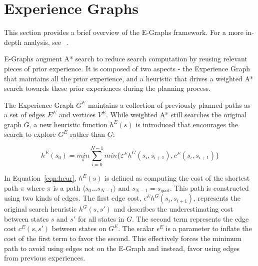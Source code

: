 \documentclass[letterpaper, 10 pt, conference]{ieeeconf}  %
\newcommand{\eqnref}[1]{Equation~\ref{eqn:#1}}
\newcommand{\eqnlab}[1]{\label{eqn:#1}}
\newcommand{\heg}{h^{E}}
\newcommand{\eeg}{\varepsilon^{E}}
\begin{document}
\section{Experience Graphs}

This section provides a brief overview of the E-Graphs framework. For a more
in-depth analysis, see ~\cite{PhillipsRSS:2012}.

E-Graphs augment A* search to reduce search computation by reusing relevant
pieces of prior experience. It is composed of two aspects - the Experience Graph
that maintains all the prior experience, and a heuristic that drives a weighted
A* search towards these prior experiences during the planning process.

The Experience Graph $G^E$ maintains a collection of previously planned paths as
a set of edges $E^E$ and vertices $V^E$. While weighted A* still
searches the original graph $G$, a new heuristic function $h^E(s)$ is introduced
that encourages the search to explore $G^E$ rather than $G$:

\begin{equation}
\heg(s_0) = \underset{\pi}{min} \sum\limits_{i=0}^{N-1} min \lbrace \eeg h^G(s_i,s_{i+1}), c^{E}(s_i,s_{i+1}) \rbrace 
\eqnlab{heur}
\end{equation}

In \eqnref{heur}, $h^E(s)$ is defined as computing the cost of the shortest path $\pi$
where $\pi$ is a path $\langle s_0 \dotsc s_{N-1} \rangle$ and
$s_{N-1}=s_{goal}$.  This path is constructed using two kinds of edges. The
first edge cost, $\epsilon^Eh^G(s_i, s_{i+1})$, represents the original search
heuristic $h^G(s,s')$ and describes the underestimating cost between states
$s$ and $s'$ for all states in $G$. The second term represents the edge cost
$c^E(s, s')$ between states on $G^E$. The scalar $\epsilon^E$ is a parameter to
inflate the cost of the first term to favor the second. This effectively
forces the minimum path to avoid using edges not on the E-Graph and
instead, favor using edges from previous experiences.
\end{document}
